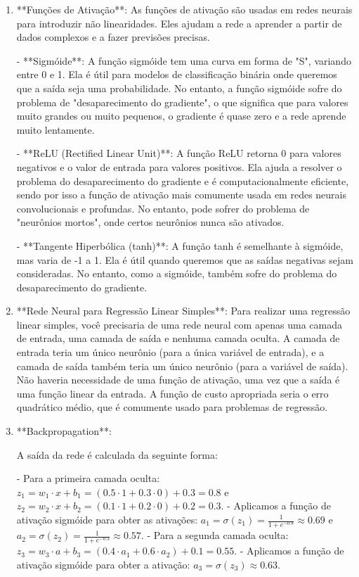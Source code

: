 \documentclass[12pt,a4paper, brazil]{article}
\begin{document}
\begin{enumerate}

  \item **Funções de Ativação**: As funções de ativação são usadas em redes neurais para introduzir não linearidades. Eles ajudam a rede a aprender a partir de dados complexos e a fazer previsões precisas. 
   
   - **Sigmóide**: A função sigmóide tem uma curva em forma de "S", variando entre 0 e 1. Ela é útil para modelos de classificação binária onde queremos que a saída seja uma probabilidade. No entanto, a função sigmóide sofre do problema de "desaparecimento do gradiente", o que significa que para valores muito grandes ou muito pequenos, o gradiente é quase zero e a rede aprende muito lentamente.
   
   - **ReLU (Rectified Linear Unit)**: A função ReLU retorna 0 para valores negativos e o valor de entrada para valores positivos. Ela ajuda a resolver o problema do desaparecimento do gradiente e é computacionalmente eficiente, sendo por isso a função de ativação mais comumente usada em redes neurais convolucionais e profundas. No entanto, pode sofrer do problema de "neurônios mortos", onde certos neurônios nunca são ativados.
   
   - **Tangente Hiperbólica (tanh)**: A função tanh é semelhante à sigmóide, mas varia de -1 a 1. Ela é útil quando queremos que as saídas negativas sejam consideradas. No entanto, como a sigmóide, também sofre do problema do desaparecimento do gradiente.

   \item **Rede Neural para Regressão Linear Simples**: Para realizar uma regressão linear simples, você precisaria de uma rede neural com apenas uma camada de entrada, uma camada de saída e nenhuma camada oculta. A camada de entrada teria um único neurônio (para a única variável de entrada), e a camada de saída também teria um único neurônio (para a variável de saída). Não haveria necessidade de uma função de ativação, uma vez que a saída é uma função linear da entrada. A função de custo apropriada seria o erro quadrático médio, que é comumente usado para problemas de regressão.

   \item **Backpropagation**:

   A saída da rede é calculada da seguinte forma:
   
   - Para a primeira camada oculta: $z_1 = w_1 \cdot x + b_1 = (0.5 \cdot 1 + 0.3 \cdot 0) + 0.3 = 0.8$ e $z_2 = w_2 \cdot x + b_2 = (0.1 \cdot 1 + 0.2 \cdot 0) + 0.2 = 0.3$.
   - Aplicamos a função de ativação sigmóide para obter as ativações: $a_1 = \sigma(z_1) = \frac{1}{1+e^{-0.8}} \approx 0.69$ e $a_2 = \sigma(z_2) = \frac{1}{1+e^{-0.3}} \approx 0.57$.
   - Para a segunda camada oculta: $z_3 = w_3 \cdot a + b_3 = (0.4 \cdot a_1 + 0.6 \cdot a_2) + 0.1 = 0.55$.
   - Aplicamos a função de ativação sigmóide para obter a ativação: $a_3 = \sigma(z_3) \approx 0.63$.


\end{enumerate}
\end{document}
